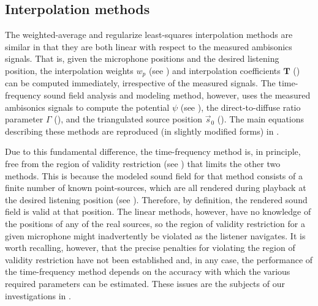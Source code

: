 

\subsection{Interpolation methods}
The weighted-average and regularize least-squares interpolation methods are similar in that they are both linear with respect to the measured ambisonics signals.
That is, given the microphone positions and the desired listening position, the interpolation weights $w_p$ (see ) and interpolation coefficients $\mathbf{T}$ () can be computed immediately, irrespective of the measured signals.
The time-frequency sound field analysis and modeling method, however, uses the measured ambisonics signals to compute the potential $\psi$ (see ), the direct-to-diffuse ratio parameter $\Gamma$ (), and the triangulated source position $\vec{s}_0$ ().
The main equations describing these methods are reproduced (in slightly modified forms) in .

Due to this fundamental difference, the time-frequency method is, in principle, free from the region of validity restriction (see ) that limits the other two methods.
This is because the modeled sound field for that method consists of a finite number of known point-sources, which are all rendered during playback at the desired listening position (see ).
Therefore, by definition, the rendered sound field is valid at that position.
The linear methods, however, have no knowledge of the positions of any of the real sources, so the region of validity restriction for a given microphone might inadvertently be violated as the listener navigates.
It is worth recalling, however, that the precise penalties for violating the region of validity restriction have not been established and, in any case, the performance of the time-frequency method depends on the accuracy with which the various required parameters can be estimated.
These issues are the subjects of our investigations in .

